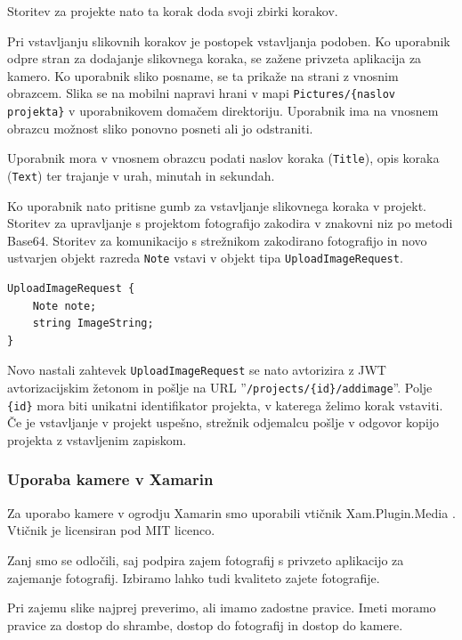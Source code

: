 \documentclass[a4paper, 12pt]{book}
\begin{document}
Storitev za projekte nato ta korak doda svoji zbirki korakov.

Pri vstavljanju slikovnih korakov je postopek vstavljanja podoben.
Ko uporabnik odpre stran za dodajanje slikovnega koraka, se zažene privzeta aplikacija za kamero.
Ko uporabnik sliko posname, se ta prikaže na strani z vnosnim obrazcem.
Slika se na mobilni napravi hrani v mapi \texttt{Pictures/\{naslov projekta\}} v uporabnikovem domačem direktoriju.
Uporabnik ima na vnosnem obrazcu možnost sliko ponovno posneti ali jo odstraniti.

Uporabnik mora v vnosnem obrazcu podati naslov koraka (\texttt{Title}), opis koraka (\texttt{Text}) ter trajanje v urah, minutah in sekundah.

Ko uporabnik nato pritisne gumb za vstavljanje slikovnega koraka v projekt.
Storitev za upravljanje s projektom fotografijo zakodira v znakovni niz po metodi Base64.
Storitev za komunikacijo s strežnikom zakodirano fotografijo in novo ustvarjen objekt razreda \texttt{Note} vstavi v objekt tipa \texttt{UploadImageRequest}.

\begin{Verbatim}[commandchars=+\[\]]
UploadImageRequest {
    Note note;
    string ImageString; 
}
\end{Verbatim}

Novo nastali zahtevek \texttt{UploadImageRequest} se nato avtorizira z JWT avtorizacijskim žetonom in pošlje na URL ''\texttt{/projects/\{id\}/addimage}''.
Polje \texttt{\{id\}} mora biti unikatni identifikator projekta, v katerega želimo korak vstaviti.
Če je vstavljanje v projekt uspešno, strežnik odjemalcu pošlje v odgovor kopijo projekta z vstavljenim zapiskom.


\subsubsection{Uporaba kamere v Xamarin}


Za uporabo kamere v ogrodju Xamarin smo uporabili vtičnik Xam.Plugin.Media \cite{xampluginmedia}.
Vtičnik je licensiran pod MIT licenco.

Zanj smo se odločili, saj podpira zajem fotografij s privzeto aplikacijo za zajemanje fotografij.
Izbiramo lahko tudi kvaliteto zajete fotografije.

Pri zajemu slike najprej preverimo, ali imamo zadostne pravice.
Imeti moramo pravice za dostop do shrambe, dostop do fotografij in dostop do kamere.
\end{document}
